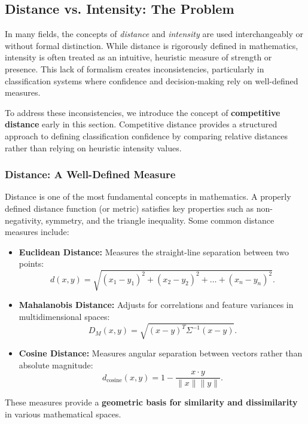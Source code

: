 \subsection{Distance vs. Intensity: The Problem}

In many fields, the concepts of \textit{distance} and \textit{intensity} are used interchangeably or without formal distinction. While distance is rigorously defined in mathematics, intensity is often treated as an intuitive, heuristic measure of strength or presence. This lack of formalism creates inconsistencies, particularly in classification systems where confidence and decision-making rely on well-defined measures.

To address these inconsistencies, we introduce the concept of \textbf{competitive distance} early in this section. Competitive distance provides a structured approach to defining classification confidence by comparing relative distances rather than relying on heuristic intensity values.

\subsubsection{Distance: A Well-Defined Measure}

Distance is one of the most fundamental concepts in mathematics. A properly defined distance function (or metric) satisfies key properties such as non-negativity, symmetry, and the triangle inequality. Some common distance measures include:

\begin{itemize}
    \item \textbf{Euclidean Distance:} Measures the straight-line separation between two points:
    \[
    d(x, y) = \sqrt{(x_1 - y_1)^2 + (x_2 - y_2)^2 + \dots + (x_n - y_n)^2}.
    \]
    \item \textbf{Mahalanobis Distance:} Adjusts for correlations and feature variances in multidimensional spaces:
    \[
    D_M(x, y) = \sqrt{(x - y)^T \Sigma^{-1} (x - y)}.
    \]
    \item \textbf{Cosine Distance:} Measures angular separation between vectors rather than absolute magnitude:
    \[
    d_{\text{cosine}}(x, y) = 1 - \frac{x \cdot y}{\|x\| \|y\|}.
    \]
\end{itemize}

These measures provide a \textbf{geometric basis for similarity and dissimilarity} in various mathematical spaces.


